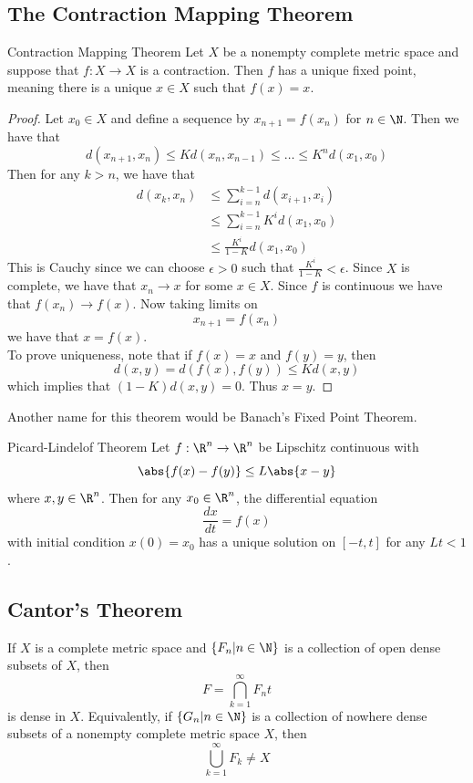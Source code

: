 \documentclass[a4paper]{article}
\begin{document}
\subsection{The Contraction Mapping Theorem}
\begin{thm}{Contraction Mapping Theorem}{} Let $X$ be a nonempty complete metric space and suppose that $f:X\to X$ is a contraction. Then $f$ has a unique fixed point, meaning there is a unique $x\in X$ such that $f(x)=x$. 
\begin{proof}
Let $x_0\in X$ and define a sequence by $x_{n+1}=f(x_n)$ for $n\in\N$. Then we have that $$d(x_{n+1},x_n)\leq Kd(x_n,x_{n-1})\leq\dots\leq K^nd(x_1,x_0)$$ Then for any $k>n$, we have that 
\begin{align*}
d(x_k,x_n)&\leq\sum_{i=n}^{k-1}d(x_{i+1},x_i)\\
&\leq\sum_{i=n}^{k-1}K^id(x_1,x_0)\\
&\leq\frac{K^i}{1-K}d(x_1,x_0)
\end{align*}
This is Cauchy since we can choose $\epsilon>0$ such that $\frac{K^i}{1-K}<\epsilon$. Since $X$ is complete, we have that $x_n\to x$ for some $x\in X$. Since $f$ is continuous we have that $f(x_n)\to f(x)$. Now taking limits on $$x_{n+1}=f(x_n)$$ we have that $x=f(x)$. \\
To prove uniqueness, note that if $f(x)=x$ and $f(y)=y$, then $$d(x,y)=d(f(x),f(y))\leq Kd(x,y)$$ which implies that $(1-K)d(x,y)=0$. Thus $x=y$. 
\end{proof}
\end{thm}

Another name for this theorem would be Banach's Fixed Point Theorem. 

\begin{thm}{Picard-Lindelof Theorem}{} Let $f:\R^n\to\R^n$ be Lipschitz continuous with $$\abs{f(x)-f(y)}\leq L\abs{x-y}$$ where $x,y\in\R^n$. Then for any $x_0\in\R^n$, the differential equation $$\frac{dx}{dt}=f(x)$$ with initial condition $x(0)=x_0$ has a unique solution on $[-t,t]$ for any $Lt<1$. 
\end{thm}

\subsection{Cantor's Theorem}
\begin{thm}{}{} If $X$ is a complete metric space and $\{F_n|n\in\N\}$ is a collection of open dense subsets of $X$, then $$F=\bigcap_{k=1}^\infty F_nt$$ is dense in $X$. Equivalently, if $\{G_n|n\in\N\}$ is a collection of nowhere dense subsets of a nonempty complete metric space $X$, then $$\bigcup_{k=1}^\infty F_k\neq X$$
\end{thm}
\end{document}
